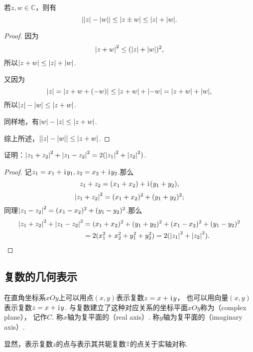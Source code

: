 \begin{theorem}[三角不等式]
若\(z,w \in \mathbb{C}\)，则有\begin{equation}
\abs{\abs{z}-\abs{w}} \leq \abs{z \pm w} \leq \abs{z} + \abs{w}.
\end{equation}
\begin{proof}
因为\begin{equation*}
\abs{z + w}^2 \leq (\abs{z} + \abs{w})^2,
\end{equation*}所以\(\abs{z + w} \leq \abs{z} + \abs{w}\).

又因为\begin{equation*}
\abs{z} = \abs{z + w + (-w)} \leq \abs{z+w} + \abs{-w} = \abs{z+w} + \abs{w},
\end{equation*}所以\(\abs{z}-\abs{w} \leq \abs{z+w}\).

同样地，有\(\abs{w}-\abs{z} \leq \abs{z+w}\).

综上所述，\(\abs{\abs{z}-\abs{w}}\leq\abs{z+w}\).
\end{proof}
\end{theorem}

\begin{example}
证明：\(\abs{z_1+z_2}^2 + \abs{z_1-z_2}^2 = 2 (\abs{z_1}^2 + \abs{z_2}^2)\).
\begin{proof}
记\(z_1 = x_1 + \kern1pt\mathrm{i}\kern1pt y_1, z_2 = x_2 + \kern1pt\mathrm{i}\kern1pt y_2\).那么\begin{equation*}
z_1+z_2 = (x_1+x_2) + \kern1pt\mathrm{i}\kern1pt(y_1+y_2),
\end{equation*}\begin{equation*}
\abs{z_1+z_2}^2 = (x_1+x_2)^2 + (y_1+y_2)^2;
\end{equation*}同理\(\abs{z_1-z_2}^2 = (x_1-x_2)^2 + (y_1-y_2)^2\).那么\begin{align*}
\abs{z_1+z_2}^2 + \abs{z_1-z_2}^2
&= (x_1+x_2)^2 + (y_1+y_2)^2
+ (x_1-x_2)^2 + (y_1-y_2)^2 \\
&= 2 ( x_1^2 + x_2^2 + y_1^2 + y_2^2 )
= 2 ( \abs{z_1}^2 + \abs{z_2}^2 ).
\qedhere
\end{align*}
\end{proof}
\end{example}

\subsection{复数的几何表示}
\begin{definition}[复数在复平面上的几何表示]
在直角坐标系\(xOy\)上可以用点\((x,y)\)表示复数\(z=x+\kern1pt\mathrm{i}\kern1pt y\)，
也可以用向量\((x,y)\)表示复数\(z=x+\kern1pt\mathrm{i}\kern1pt y\).
与复数建立了这种对应关系的坐标平面\(xOy\)称为（complex plane），
记作\(C\).
称\(x\)轴为复平面的（real axis）.
称\(y\)轴为复平面的（imaginary axis）.

显然，表示复数\(z\)的点与表示其共轭复数\(\overline{z}\)的点关于实轴对称.
\end{definition}

